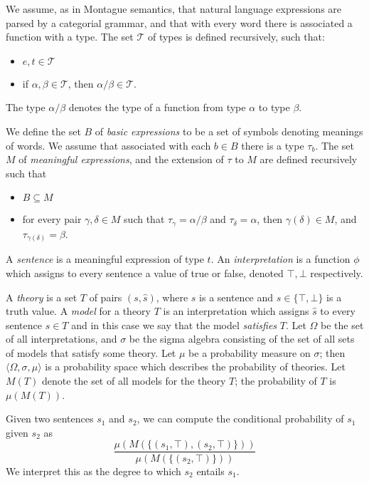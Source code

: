 \documentclass[letterpaper]{article}
\begin{document}
We assume, as in Montague semantics, that natural language expressions
are parsed by a categorial grammar, and that with every word there is
associated a function with a type. The set $\mathcal{T}$ of types is defined
recursively, such that:
\begin{itemize}
\item $e,t\in \mathcal{T}$
\item if $\alpha, \beta\in \mathcal{T}$, then $\alpha/\beta\in \mathcal{T}$.
\end{itemize}
The type $\alpha/\beta$ denotes the type of a function from type
$\alpha$ to type $\beta$.

We define the set $B$ of \emph{basic expressions} to be a set of
symbols denoting meanings of words. We assume that associated with
each $b\in B$ there is a type $\tau_b$. The set $M$ of
\emph{meaningful expressions}, and the extension of $\tau$ to $M$ are
defined recursively such that
\begin{itemize}
\item $B\subseteq M$
\item for every pair $\gamma,\delta\in M$ such that $\tau_\gamma =
  \alpha/\beta$ and $\tau_\delta = \alpha$, then $\gamma(\delta)\in
  M$, and $\tau_{\gamma(\delta)} = \beta$.
\end{itemize}

A \emph{sentence} is a meaningful expression of type $t$. An
\emph{interpretation} is a function $\phi$ which assigns to every
sentence a value of true or false, denoted $\top, \bot$ respectively.

A \emph{theory} is a set $T$ of pairs $(s,\hat{s})$, where $s$ is a
sentence and $\hat{s}\in\{\top,\bot\}$ is a truth value. A
\emph{model} for a theory $T$ is an interpretation which assigns
$\hat{s}$ to every sentence $s\in T$ and in this case we say that the model \emph{satisfies} $T$. Let $\Omega$ be the set of all
interpretations, and $\sigma$ be the sigma algebra consisting of the
set of all sets of models that satisfy some theory. Let $\mu$ be a probability measure
on $\sigma$; then $\langle\Omega,\sigma,\mu\rangle$ is a probability
space which describes the probability of theories. Let $M(T)$ denote
the set of all models for the theory $T$; the probability of $T$ is
$\mu(M(T))$.

Given two sentences $s_1$ and $s_2$, we can compute the conditional
probability of $s_1$ given $s_2$ as
$$\frac{\mu(M(\{(s_1, \top), (s_2, \top)\}))}{\mu(M(\{(s_2,\top)\}))}$$
We interpret this as the degree to which $s_2$ entails $s_1$.
\end{document}
